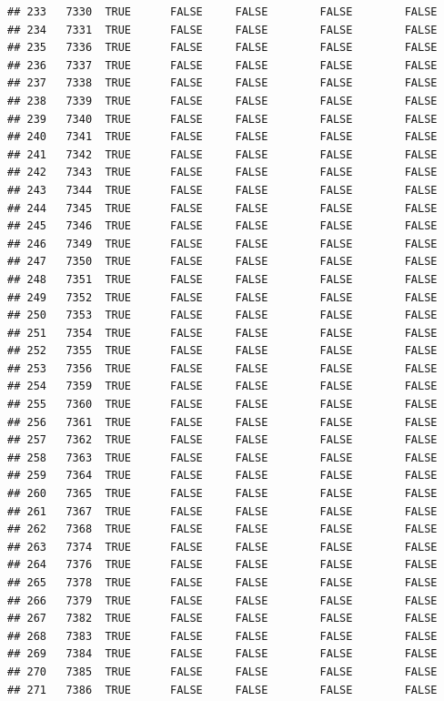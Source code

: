 \documentclass[
  10pt,
  b5paper,
  oneside]{book}
\begin{document}
\begin{verbatim}
## 233   7330  TRUE      FALSE     FALSE        FALSE        FALSE
## 234   7331  TRUE      FALSE     FALSE        FALSE        FALSE
## 235   7336  TRUE      FALSE     FALSE        FALSE        FALSE
## 236   7337  TRUE      FALSE     FALSE        FALSE        FALSE
## 237   7338  TRUE      FALSE     FALSE        FALSE        FALSE
## 238   7339  TRUE      FALSE     FALSE        FALSE        FALSE
## 239   7340  TRUE      FALSE     FALSE        FALSE        FALSE
## 240   7341  TRUE      FALSE     FALSE        FALSE        FALSE
## 241   7342  TRUE      FALSE     FALSE        FALSE        FALSE
## 242   7343  TRUE      FALSE     FALSE        FALSE        FALSE
## 243   7344  TRUE      FALSE     FALSE        FALSE        FALSE
## 244   7345  TRUE      FALSE     FALSE        FALSE        FALSE
## 245   7346  TRUE      FALSE     FALSE        FALSE        FALSE
## 246   7349  TRUE      FALSE     FALSE        FALSE        FALSE
## 247   7350  TRUE      FALSE     FALSE        FALSE        FALSE
## 248   7351  TRUE      FALSE     FALSE        FALSE        FALSE
## 249   7352  TRUE      FALSE     FALSE        FALSE        FALSE
## 250   7353  TRUE      FALSE     FALSE        FALSE        FALSE
## 251   7354  TRUE      FALSE     FALSE        FALSE        FALSE
## 252   7355  TRUE      FALSE     FALSE        FALSE        FALSE
## 253   7356  TRUE      FALSE     FALSE        FALSE        FALSE
## 254   7359  TRUE      FALSE     FALSE        FALSE        FALSE
## 255   7360  TRUE      FALSE     FALSE        FALSE        FALSE
## 256   7361  TRUE      FALSE     FALSE        FALSE        FALSE
## 257   7362  TRUE      FALSE     FALSE        FALSE        FALSE
## 258   7363  TRUE      FALSE     FALSE        FALSE        FALSE
## 259   7364  TRUE      FALSE     FALSE        FALSE        FALSE
## 260   7365  TRUE      FALSE     FALSE        FALSE        FALSE
## 261   7367  TRUE      FALSE     FALSE        FALSE        FALSE
## 262   7368  TRUE      FALSE     FALSE        FALSE        FALSE
## 263   7374  TRUE      FALSE     FALSE        FALSE        FALSE
## 264   7376  TRUE      FALSE     FALSE        FALSE        FALSE
## 265   7378  TRUE      FALSE     FALSE        FALSE        FALSE
## 266   7379  TRUE      FALSE     FALSE        FALSE        FALSE
## 267   7382  TRUE      FALSE     FALSE        FALSE        FALSE
## 268   7383  TRUE      FALSE     FALSE        FALSE        FALSE
## 269   7384  TRUE      FALSE     FALSE        FALSE        FALSE
## 270   7385  TRUE      FALSE     FALSE        FALSE        FALSE
## 271   7386  TRUE      FALSE     FALSE        FALSE        FALSE

\end{verbatim}
\end{document}

